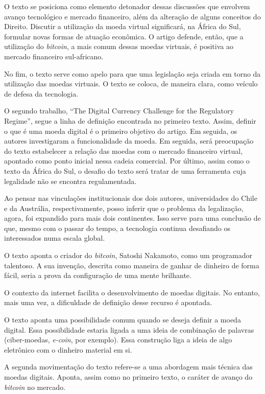 \documentclass[12pt]{article}
\begin{document}
O texto se posiciona como elemento detonador dessas discussões que envolvem avanço tecnológico e mercado financeiro, além da alteração de alguns conceitos do Direito. Discutir a utilização da moeda virtual significará, na África do Sul, formular novas formas de atuação econômica. O artigo defende, então, que a utilização do \textit{bitcoin}, a mais comum dessas moedas virtuais, é positiva ao mercado financeiro sul-africano.

No fim, o texto serve como apelo para que uma legislação seja criada em torno da utilização das moedas virtuais. O texto se coloca, de maneira clara, como veículo de defesa da tecnologia.

O segundo trabalho, “The Digital Currency Challenge for the Regulatory Regime”, segue a linha de definição encontrada no primeiro texto. Assim, definir o que é uma moeda digital é o primeiro objetivo do artigo. Em seguida, os autores investigaram a funcionalidade da moeda. Em seguida, será preocupação do texto estabelecer a relação das moedas com o mercado financeiro virtual, apontado como ponto inicial nessa cadeia comercial. Por último, assim como o texto da África do Sul, o desafio do texto será tratar de uma ferramenta cuja legalidade não se encontra regulamentada.

Ao pensar nas vinculações institucionais dos dois autores, universidades do Chile e da Austrália, respectivamente, posso inferir que o problema da legalização, agora, foi expandido para mais dois continentes. Isso serve para uma conclusão de que, mesmo com o passar do tempo, a tecnologia continua desafiando os interessados numa escala global.

O texto aponta o criador do \textit{bitcoin}, Satoshi Nakamoto, como um programador talentoso. A sua invenção, descrita como maneira de ganhar de dinheiro de forma fácil, seria a prova da configuração de uma mente brilhante.

O contexto da internet facilita o desenvolvimento de moedas digitais. No entanto, mais uma vez, a dificuldade de definição desse recurso é apontada.

O texto aponta uma possibilidade comum quando se deseja definir a moeda digital. Essa possibilidade estaria ligada a uma ideia  de combinação de palavras (ciber-moedas, \textit{e-coin}, por exemplo). Essa construção liga a ideia de algo eletrônico com o dinheiro material em si. 

A segunda movimentação do texto refere-se a uma abordagem mais técnica das moedas digitais. Aponta, assim como no primeiro texto, o caráter de avanço do \textit{bitcoin} no mercado.
\end{document}
